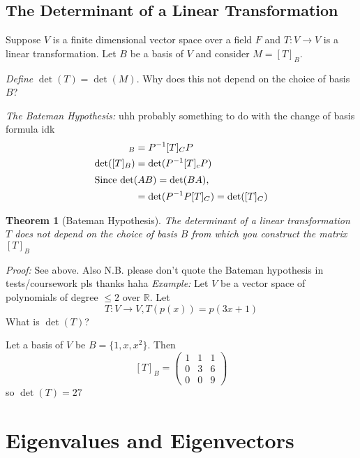 \documentclass{report}
\newtheorem{theorem}{Theorem}[subsection]
\theoremstyle{remark}
\theoremstyle{definition}
\theoremstyle{definition}
\theoremstyle{theorem}
\begin{document}
\subsection{The Determinant of a Linear Transformation}
Suppose $V$ is a finite dimensional vector space over a field $F$ and $T:V \rightarrow V$ is a linear transformation. Let $B$ be a basis of $V$ and consider $M = [T]_B$. 
\par
\emph{Define} $\det(T)=\det(M)$. Why does this not depend on the choice of basis $B$?\par
\emph{The Bateman Hypothesis:} uhh probably something to do with the change of basis formula idk
\begin{align*}
    [T]_B &= P^{-1}[T]_CP\\
    \det([T]_B) &= \det(P^{-1}[T]_cP)\\
    \intertext{Since $\det(AB)=\det(BA)$,}
    &= \det(P^{-1}P[T]_C) = \det([T]_C)
\end{align*}
\begin{theorem}[Bateman Hypothesis]
The determinant of a linear transformation $T$ does not depend on the choice of basis $B$ from which you construct the matrix $[T]_B$
\end{theorem}
\emph{Proof:} See above. Also N.B. please don't quote the Bateman hypothesis in tests/coursework pls thanks haha
\emph{Example:} Let $V$ be a vector space of polynomials of degree $\leq 2$ over $\mathbb{R}$. Let
\[T:V \rightarrow V, T(p(x))=p(3x+1)\]
What is $\det(T)$?\par
Let a basis of $V$ be $B=\{1,x,x^2\}$. Then
\[[T]_B=\begin{pmatrix}
1&1&1\\
0&3&6\\
0&0&9
\end{pmatrix}\]
so $\det(T)=27$
\section{Eigenvalues and Eigenvectors}
\end{document}
